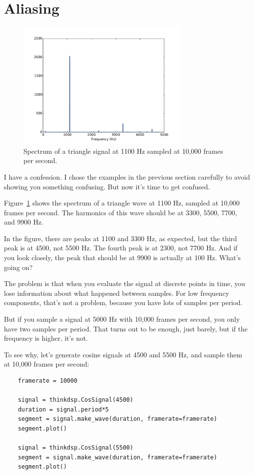 \documentclass[12pt]{book}
\begin{document}
\section{Aliasing}
\label{aliasing}

\begin{figure}
\centerline{\includegraphics[height=2.5in]{figs/triangle-1100-2.pdf}}
\caption{Spectrum of a triangle signal at 1100 Hz sampled at
10,000 frames per second.}
\label{fig.triangle.1100.2}
\end{figure}

I have a confession.  I chose the examples in the previous section
carefully to avoid showing you something confusing.  But now it's
time to get confused.

Figure~\ref{fig.triangle.1100.2} shows the spectrum of a triangle wave
at 1100 Hz, sampled at 10,000 frames per second.  The harmonics
of this wave should be at 3300, 5500, 7700, and 9900 Hz.

In the figure, there are peaks at 1100 and 3300 Hz, as expected, but
the third peak is at 4500, not 5500 Hz.  The
fourth peak is at 2300, not 7700 Hz.  And if you look closely, the
peak that should be at 9900 is actually at 100 Hz.  What's going on?

The problem is that when you evaluate the signal at
discrete points in time, you lose information about what happened
between samples.  For low frequency components, that's not a
problem, because you have lots of samples per period.

But if you sample a signal at 5000 Hz with 10,000 frames per second,
you only have two samples per period.  That turns out to be enough,
just barely, but if the frequency is higher, it's not.

To see why, let's generate cosine signals at 4500 and 5500 Hz,
and sample them at 10,000 frames per second:

\begin{verbatim}
    framerate = 10000

    signal = thinkdsp.CosSignal(4500)
    duration = signal.period*5
    segment = signal.make_wave(duration, framerate=framerate)
    segment.plot()

    signal = thinkdsp.CosSignal(5500)
    segment = signal.make_wave(duration, framerate=framerate)
    segment.plot()
\end{verbatim}
\end{document}
